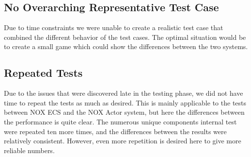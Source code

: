\subsection{No Overarching Representative Test Case}
Due to time constraints we were unable to create a realistic test case that combined the different behavior
of the test cases.
The optimal situation would be to create a small game which could show the differences between the two systems.

\subsection{Repeated Tests}
Due to the issues that were discovered late in the testing phase, we did not have time to repeat the tests
as much as desired.
This is mainly applicable to the tests between NOX ECS and the NOX Actor system, but here the differences
between the performance is quite clear.
The numerous unique components internal test were repeated ten more times, and the differences between
the results were relatively consistent. However, even more repetition is desired here to give more reliable numbers.
